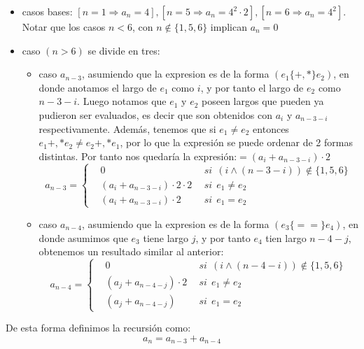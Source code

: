 \documentclass[letterpaper,10pt,table, dvipsnames]{article}
\begin{document}
\begin{itemize}
  \item casos bases: $[n=1 \Rightarrow a_n=4], [n=5 \Rightarrow a_n=4^2 \cdot 2], [n=6 \Rightarrow a_n=4^2]$. Notar que los casos $n<6$, con $n\not\in \{1,5,6\}$ implican $a_n=0$ 
  \item caso $(n>6)$ se divide en tres:
  \begin{itemize}
    \item caso $a_{n-3}$, asumiendo que la expresion es de la forma $(e_1 \{+,*\} e_2)$, en donde anotamos el largo de $e_1$ como $i$, y por tanto el largo de $e_2$ como $n-3-i$. Luego notamos que $e_1$ y $e_2$ poseen largos que pueden ya pudieron ser evaluados, es decir que son obtenidos con $a_{i} $ y $a_{n-3-i}$ respectivamente. Además, tenemos que si $e_1 \neq e_2$ entonces $e_1 {+,*} e_2 \neq e_2 {+,*} e_1$, por lo que la expresión se puede ordenar de 2 formas distintas. Por tanto nos quedaría la expresión:$= (a_{i} + a_{n-3-i})\cdot 2$
    \begin{equation*}
    a_{n-3}= \left\{
    \begin{aligned}
        &0\ \ &si\ \ (i\wedge (n-3-i)) \not\in \{1,5,6\}  \\
        &(a_{i} + a_{n-3-i})\cdot 2 \cdot 2\ \ &si\ \ e_1 \neq e_2\\
        &(a_{i} + a_{n-3-i})\cdot 2 \ \ &si\ \ e_1 = e_2
    \end{aligned}
    \right.    
    \end{equation*}
    \item caso $a_{n-4}$, asumiendo que la expresion es de la forma $(e_3 \{==\} e_4)$, en donde asumimos que $e_3$ tiene largo $j$, y por tanto $e_4 $ tien largo $n-4-j$, obtenemos un resultado similar al anterior:
    \begin{equation*}
    a_{n-4}= \left\{
    \begin{aligned}
        &0\ \ &si\ \ (i\wedge (n-4-i)) \not\in \{1,5,6\}  \\
        &(a_{j} + a_{n-4-j})\cdot 2\ \ &si\ \ e_1 \neq e_2\\
        &(a_{j} + a_{n-4-j}) \ \ &si\ \ e_1 = e_2
    \end{aligned}
    \right.    
    \end{equation*}
  \end{itemize}
\end{itemize}

De esta forma definimos la recursión como:
\begin{equation}
  a_{n} = a_{n-3} + a_{n-4}
\end{equation}
\end{document}
